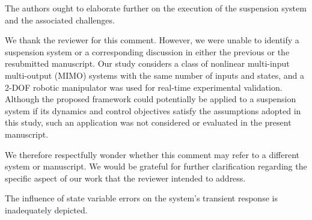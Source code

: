 \documentclass[12pt,english]{reviewresponse}
\begin{document}
% 
\begin{revcomment}[2][1]{}
	The authors ought to elaborate further on the execution of the suspension system and the associated challenges.
\end{revcomment}

\begin{revresponse}
	We thank the reviewer for this comment. 
  However, we were unable to identify a suspension system or a corresponding discussion in either the previous or the resubmitted manuscript. 
  Our study considers a class of nonlinear multi-input multi-output (MIMO) systems with the same number of inputs and states, and a 2-DOF robotic manipulator was used for real-time experimental validation. 
  Although the proposed framework could potentially be applied to a suspension system if its dynamics and control objectives satisfy the assumptions adopted in this study, such an application was not considered or evaluated in the present manuscript.

  \bigskip
  
  We therefore respectfully wonder whether this comment may refer to a different system or manuscript. 
  We would be grateful for further clarification regarding the specific aspect of our work that the reviewer intended to address.
\end{revresponse}

% 
\begin{revcomment}[2][1]{}
	The influence of state variable errors on the system's transient response is inadequately depicted.
\end{revcomment}
\end{document}
